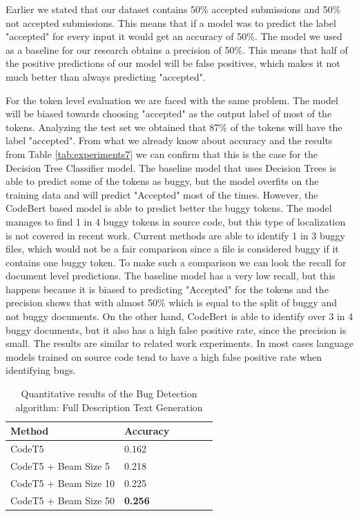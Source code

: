 \documentclass[12pt,a4paper]{report}
\begin{document}
\begin{appendices}
Earlier we stated that our dataset contains 50\% accepted submissions and 50\% not accepted submissions. This means that if a model was to predict the label "accepted" for every input it would get an accuracy of 50\%. The model we used as a baseline for our research obtains a precision of 50\%. This means that half of the positive predictions of our model will be false positives, which makes it not much better than always predicting "accepted".

For the token level evaluation we are faced with the same problem. The model will be biased towards choosing "accepted" as the output label of most of the tokens. Analyzing the test set we obtained that 87\% of the tokens will have the label "accepted". From what we already know about accuracy and the results from Table \ref{tab:experiments7} we can confirm that this is the case for the Decision Tree Classifier model. The baseline model that uses Decision Trees is able to predict some of the tokens as buggy, but the model overfits on the training data and will predict "Accepted" most of the times. However, the CodeBert based model is able to predict better the buggy tokens. The model manages to find 1 in 4 buggy tokens in source code, but this type of localization is not covered in recent work. Current methods are able to identify 1 in 3 buggy files, which would not be a fair comparison since a file is considered buggy if it contains one buggy token. To make such a comparison we can look the recall for document level predictions. The baseline model has a very low recall, but this happens because it is biased to predicting "Accepted" for the tokens and the precision shows that with almost 50\% which is equal to the split of buggy and not buggy documents. On the other hand, CodeBert is able to identify over 3 in 4 buggy documents, but it also has a high false positive rate, since the precision is small. The results are similar to related work experiments. In most cases language models trained on source code tend to have a high false positive rate when identifying bugs.

\begin{table}[H]\small\linespread{1}
\centering
\caption{Quantitative results of the Bug Detection algorithm: Full Description Text Generation}
\label{tab:experiments16}
\begin{tabular}{p{4cm} l >{\raggedright\arraybackslash}p{2cm} >{\raggedright\arraybackslash}p{2cm} >{\raggedright\arraybackslash}p{2cm} >{\raggedright\arraybackslash}p{2cm}}
\textbf{Method} & \textbf{Accuracy} \\
\hline
CodeT5                  & 0.162  \\
\hline
CodeT5 + Beam Size 5    & 0.218 \\
\hline
CodeT5 + Beam Size 10   & 0.225 \\
\hline
CodeT5 + Beam Size 50   & \textbf{0.256} \\
\end{tabular}
\end{table}


\end{appendices}
\end{document}
